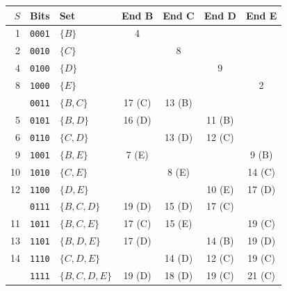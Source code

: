 \documentclass[10pt,a4paper]{article}
\begin{document}
\noindent
\begin{minipage}[t]{0.56\linewidth}
\vspace{0pt}
\centering\scriptsize
\begin{tabular}{@{}r c l c c c c@{}}
\toprule
$S$ & Bits & Set & End B & End C & End D & End E \\
\midrule
1 & \texttt{0001} & $\{B\}$ & 4 &  &  &  \\
2 & \texttt{0010} & $\{C\}$ &  & 8 &  &  \\
4 & \texttt{0100} & $\{D\}$ &  &  & 9 &  \\
8 & \texttt{1000} & $\{E\}$ &  &  &  & 2 \\
\addlinespace[1pt]
3 & \texttt{0011} & $\{B, C\}$ & 17 (C) & 13 (B) &  &  \\
5 & \texttt{0101} & $\{B, D\}$ & 16 (D) &  & 11 (B) &  \\
6 & \texttt{0110} & $\{C, D\}$ &  & 13 (D) & 12 (C) &  \\
9 & \texttt{1001} & $\{B, E\}$ & 7 (E) &  &  & 9 (B) \\
10 & \texttt{1010} & $\{C, E\}$ &  & 8 (E) &  & 14 (C) \\
12 & \texttt{1100} & $\{D, E\}$ &  &  & 10 (E) & 17 (D) \\
\addlinespace[1pt]
7 & \texttt{0111} & $\{B, C, D\}$ & 19 (D) & 15 (D) & 17 (C) &  \\
11 & \texttt{1011} & $\{B, C, E\}$ & 17 (C) & 15 (E) &  & 19 (C) \\
13 & \texttt{1101} & $\{B, D, E\}$ & 17 (D) &  & 14 (B) & 19 (D) \\
14 & \texttt{1110} & $\{C, D, E\}$ &  & 14 (D) & 12 (C) & 19 (C) \\
\addlinespace[1pt]
15 & \texttt{1111} & $\{B, C, D, E\}$ & 19 (D) & 18 (D) & 19 (C) & 21 (C) \\
\bottomrule
\end{tabular}
\label{tab-trace-hk}
\end{minipage}\hfill
\end{document}
